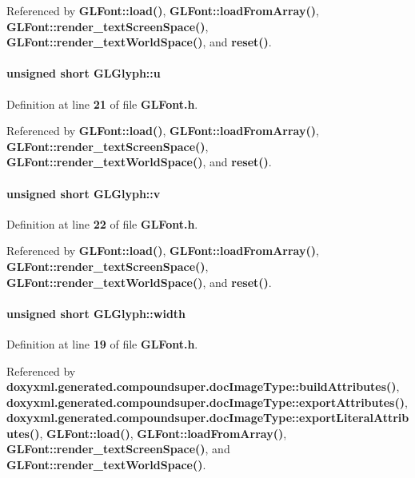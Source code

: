 Referenced by {\bf G\+L\+Font\+::load()}, {\bf G\+L\+Font\+::load\+From\+Array()}, {\bf G\+L\+Font\+::render\+\_\+text\+Screen\+Space()}, {\bf G\+L\+Font\+::render\+\_\+text\+World\+Space()}, and {\bf reset()}.

\paragraph[{u}]{\setlength{\rightskip}{0pt plus 5cm}unsigned short G\+L\+Glyph\+::u}\label{structGLGlyph_adc2915b190f4c8a19819e8373d69a7a8}


Definition at line {\bf 21} of file {\bf G\+L\+Font.\+h}.



Referenced by {\bf G\+L\+Font\+::load()}, {\bf G\+L\+Font\+::load\+From\+Array()}, {\bf G\+L\+Font\+::render\+\_\+text\+Screen\+Space()}, {\bf G\+L\+Font\+::render\+\_\+text\+World\+Space()}, and {\bf reset()}.

\paragraph[{v}]{\setlength{\rightskip}{0pt plus 5cm}unsigned short G\+L\+Glyph\+::v}\label{structGLGlyph_a1ca6670dcce96e99622975d7d5ab949b}


Definition at line {\bf 22} of file {\bf G\+L\+Font.\+h}.



Referenced by {\bf G\+L\+Font\+::load()}, {\bf G\+L\+Font\+::load\+From\+Array()}, {\bf G\+L\+Font\+::render\+\_\+text\+Screen\+Space()}, {\bf G\+L\+Font\+::render\+\_\+text\+World\+Space()}, and {\bf reset()}.

\paragraph[{width}]{\setlength{\rightskip}{0pt plus 5cm}unsigned short G\+L\+Glyph\+::width}\label{structGLGlyph_ae54547d1bb82b20831063df8dd6f5b19}


Definition at line {\bf 19} of file {\bf G\+L\+Font.\+h}.



Referenced by {\bf doxyxml.\+generated.\+compoundsuper.\+doc\+Image\+Type\+::build\+Attributes()}, {\bf doxyxml.\+generated.\+compoundsuper.\+doc\+Image\+Type\+::export\+Attributes()}, {\bf doxyxml.\+generated.\+compoundsuper.\+doc\+Image\+Type\+::export\+Literal\+Attributes()}, {\bf G\+L\+Font\+::load()}, {\bf G\+L\+Font\+::load\+From\+Array()}, {\bf G\+L\+Font\+::render\+\_\+text\+Screen\+Space()}, and {\bf G\+L\+Font\+::render\+\_\+text\+World\+Space()}.



